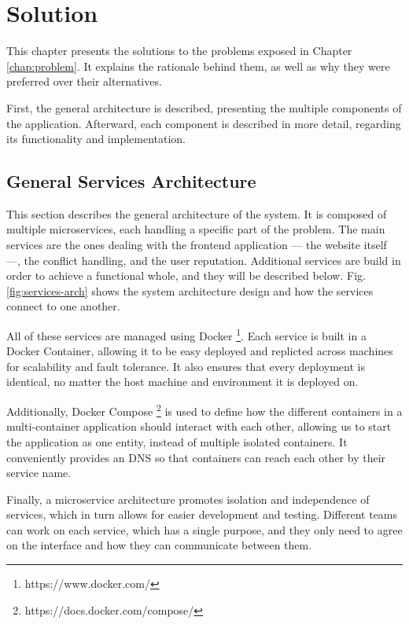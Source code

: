 \chapter{Solution}\label{chap:solution}

This chapter presents the solutions to the problems exposed in Chapter \ref{chap:problem}. It explains the rationale behind them, as well as why they were preferred over their alternatives.

First, the general architecture is described, presenting the multiple components of the application. Afterward, each component is described in more detail, regarding its functionality and implementation.

\section{General Services Architecture}

This section describes the general architecture of the system. It is composed of multiple microservices, each handling a specific part of the problem. The main services are the ones dealing with the frontend application --- the website itself ---, the conflict handling, and the user reputation. Additional services are build in order to achieve a functional whole, and they will be described below. Fig. \ref{fig:services-arch} shows the system architecture design and how the services connect to one another.

All of these services are managed using Docker \footnote{https://www.docker.com/}. Each service is built in a Docker Container, allowing it to be easy deployed and replicted across machines for scalability and fault tolerance. It also ensures that every deployment is identical, no matter the host machine and environment it is deployed on.

Additionally, Docker Compose \footnote{https://docs.docker.com/compose/} is used to define how the different containers in a multi-container application should interact with each other, allowing us to start the application as one entity, instead of multiple isolated containers. It conveniently provides an DNS so that containers can reach each other by their service name.

Finally, a microservice architecture promotes isolation and independence of services, which in turn allows for easier development and testing. Different teams can work on each service, which has a single purpose, and they only need to agree on the interface and how they can communicate between them.

